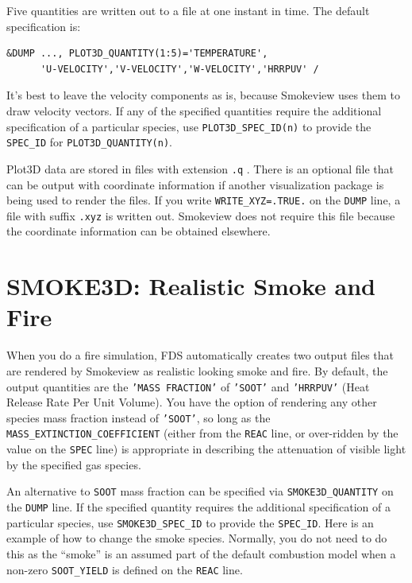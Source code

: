 \documentclass[11pt]{book}
\newcommand{\ct}{\tt\small}
\begin{document}
Five quantities are written out to a file at one instant in time. The default specification is:

\footnotesize
\begin{verbatim}
&DUMP ..., PLOT3D_QUANTITY(1:5)='TEMPERATURE',
      'U-VELOCITY','V-VELOCITY','W-VELOCITY','HRRPUV' /
\end{verbatim}
\normalsize

\noindent
It's best to leave the velocity components as is, because Smokeview
uses them to draw velocity vectors. If any of the specified quantities require the additional specification of a particular species,
use {\ct PLOT3D\_SPEC\_ID(n)} to provide the {\ct SPEC\_ID} for {\ct PLOT3D\_QUANTITY(n)}.

Plot3D data are stored in files with extension {\ct .q} . There is
an optional file that can be output with coordinate information
if another visualization package is being used to render the
files. If you write {\ct WRITE\_XYZ=.TRUE.} on the {\ct DUMP}
line, a file with suffix {\ct .xyz} is written out. Smokeview
does not require this file because the coordinate information can be
obtained elsewhere.



\section{SMOKE3D: Realistic Smoke and Fire}

\label{info:SMOKE3D}

When you do a fire simulation, FDS automatically creates two output files that are rendered by
Smokeview as realistic looking smoke and fire. By default, the output quantities are the {\ct 'MASS FRACTION'} of {\ct 'SOOT'} and {\ct 'HRRPUV'} (Heat Release Rate Per Unit Volume). You have the option of rendering any other species mass fraction instead of {\ct 'SOOT'}, so long as the
{\ct MASS\_EXTINCTION\_COEFFICIENT} (either from the {\ct REAC} line, or over-ridden by the value on the {\ct SPEC} line) is appropriate in
describing the attenuation of visible light by the specified gas species.

An alternative to {\ct SOOT} mass fraction can be specified via {\ct SMOKE3D\_QUANTITY} on the {\ct DUMP} line.
If the specified quantity requires the additional specification of a particular species,
use {\ct SMOKE3D\_SPEC\_ID} to provide the {\ct SPEC\_ID}.
Here is an example of how to change the smoke species. Normally, you do not need to do this as the ``smoke'' is an assumed part of the default combustion model when a non-zero {\ct SOOT\_YIELD} is defined on the {\ct REAC} line.
\end{document}
